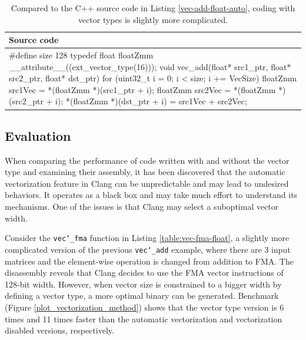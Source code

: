 \documentclass[logo,bsc,singlespacing,parskip]{infthesis}
\newenvironment{VerbatimCompact}
  {\vspace*{-2.5mm}\VerbatimEnvironment
   \par\Verbatim}
  {\endVerbatim\vspace*{-2.4mm}}
\begin{document}
\begin{table}[ht]\captionsetup{name=Listing}
\begin{tabular}{>{\raggedright\arraybackslash}p{13cm}}
    Source code\\
    \midrule
    \begin{VerbatimCompact}
#define size 128
typedef float floatZmm __attribute__((ext_vector_type(16)));
void vec_add(float* src1_ptr, float* src2_ptr, float* dst_ptr) {
    for (uint32_t i = 0; i < size; i += VecSize){
        floatZmm src1Vec = *(floatZmm *)(src1_ptr + i);
        floatZmm src2Vec = *(floatZmm *)(src2_ptr + i);
        *(floatZmm *)(dst_ptr + i) = src1Vec + src2Vec;
    }
}
\end{VerbatimCompact}
\end{tabular}
\caption{Compared to the C++ source code in Listing \ref{vec-add-float-auto},
coding with vector types is slightly more complicated.}
\label{vec-add-float-vecty}
\end{table}
\subsection{Evaluation}

\label{sec:vectorization-method-eval}
When comparing the performance of code written with and without the vector type
and examining their assembly, it has been discovered that the automatic
vectorization feature in Clang can be unpredictable and may lead to undesired
behaviors. It operates as a black box and may take much effort to understand
its mechanisms. One of the issues is that Clang may select a suboptimal vector
width.

Consider the \texttt{vec\char`_fma} function in Listing \ref{table:vec-fma-float}, a
slightly more complicated version of the previous \texttt{vec\char`_add} example,
where there are 3 input matrices and the element-wise operation is changed from
addition to FMA. The disassembly reveals that Clang decides to use the FMA vector
instructions of 128-bit width. However, when vector size is constrained to a bigger
width by defining a vector type, a more optimal binary can be generated. Benchmark
(Figure \ref{plot_vectorization_method}) shows that the vector type version is 6
times and 11 times faster than the automatic vectorization and vectorization
disabled versions, respectively.
\end{document}
